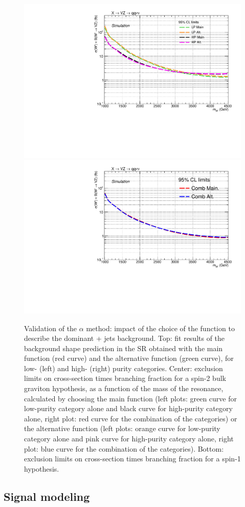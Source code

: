\begin{figure}[!htb]
    \includegraphics[width=.495\textwidth]{BackgroundFunctionValidation/Exclusion_XWZInv_main_vs_alt_LPHP_test.pdf}
    \includegraphics[width=.495\textwidth]{BackgroundFunctionValidation/Exclusion_XWZInv_main_vs_alt_comb_test.pdf}

  \caption{Validation of the $\alpha$ method: impact of the choice of the function to describe the dominant \V + jets background. Top: fit results of the background shape prediction in the SR obtained with the main function (red curve) and the alternative function (green curve), for low- (left) and high- (right) purity categories. Center: exclusion limits on cross-section times branching fraction for a spin-2 bulk graviton hypothesis, as a function of the mass of the resonance, calculated by choosing the main function (left plots: green curve for low-purity category alone and black curve for high-purity category alone, right plot: red curve for the combination of the categories) or the alternative function (left plots: orange curve for low-purity category alone and pink curve for high-purity category alone, right plot: blue curve for the combination of the categories). Bottom: exclusion limits on cross-section times branching fraction for a spin-1 \Wp hypothesis.}
  \label{fig:validation_mainalt}
\end{figure}

\clearpage

\subsection{Signal modeling}

